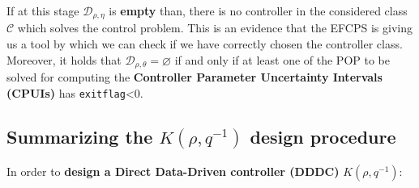 If at this stage $\mathcal{D}_{\rho,\eta}$ is \textbf{empty} than, there is no controller in the considered class $\mathcal{C}$ which solves the control problem. This is an evidence that the EFCPS is giving us a tool by which we can check if we have correctly chosen the controller class. \\
Moreover, it holds that $\mathcal{D}_{\rho, \theta}=\varnothing $ if and only if at least one of the POP to be solved for computing the \textbf{Controller Parameter Uncertainty Intervals (CPUIs)} has \texttt{exitflag}<0. 

\subsection{Summarizing the $K(\rho,q^{-1})$ design procedure}
In order to \textbf{design a Direct Data-Driven controller (DDDC)} $K(\rho,q^{-1})$: 
